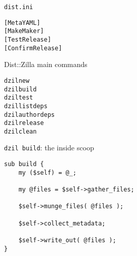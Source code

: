\documentclass[serif,14pt,color=usenames,dvipsnames]{beamer}
\begin{document}
\begin{frame}{\texttt{dist.ini}}
\linespread{0.8}
\begin{alltt}
\small
{}


{[MetaYAML]}\\
{[MakeMaker]}\\
{[TestRelease]}\\
{[ConfirmRelease]}\\

\end{alltt}
\end{frame}

\begin{frame}[fragile]{Dist::Zilla main commands}
\begin{alltt}
dzil new
dzil build
dzil test
dzil listdeps
dzil authordeps
dzil release
dzil clean
\end{alltt}
\end{frame}

\begin{frame}[fragile]{\texttt{dzil build}: the inside scoop}
\begin{verbatim}
sub build {
    my ($self) = @_;

    my @files = $self->gather_files;

    $self->munge_files( @files );

    $self->collect_metadata;

    $self->write_out( @files );
}
\end{verbatim}
\end{frame}
\end{document}

